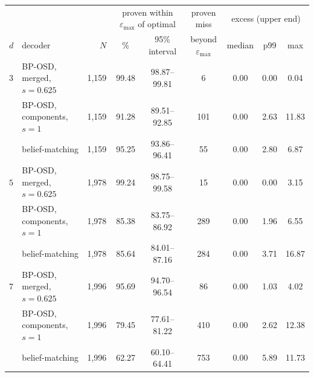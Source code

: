 \begin{tabular}{@{}llrcccccc@{}}
\toprule
 & & & \multicolumn{2}{c}{proven within $\varepsilon_{\max}$ of optimal} & proven miss & \multicolumn{3}{c}{excess (upper end)} \\
$d$ & decoder & $N$ & \% & 95\% interval & beyond $\varepsilon_{\max}$ & median & p99 & max \\
\midrule
$3$ & BP-OSD, merged, $s=0.625$ & 1{,}159 & 99.48 & 98.87--99.81 & 6 & 0.00 & 0.00 & 0.04 \\
 & BP-OSD, components, $s=1$ & 1{,}159 & 91.28 & 89.51--92.85 & 101 & 0.00 & 2.63 & 11.83 \\
 & belief-matching & 1{,}159 & 95.25 & 93.86--96.41 & 55 & 0.00 & 2.80 & 6.87 \\
\addlinespace
$5$ & BP-OSD, merged, $s=0.625$ & 1{,}978 & 99.24 & 98.75--99.58 & 15 & 0.00 & 0.00 & 3.15 \\
 & BP-OSD, components, $s=1$ & 1{,}978 & 85.38 & 83.75--86.92 & 289 & 0.00 & 1.96 & 6.55 \\
 & belief-matching & 1{,}978 & 85.64 & 84.01--87.16 & 284 & 0.00 & 3.71 & 16.87 \\
\addlinespace
$7$ & BP-OSD, merged, $s=0.625$ & 1{,}996 & 95.69 & 94.70--96.54 & 86 & 0.00 & 1.03 & 4.02 \\
 & BP-OSD, components, $s=1$ & 1{,}996 & 79.45 & 77.61--81.22 & 410 & 0.00 & 2.62 & 12.38 \\
 & belief-matching & 1{,}996 & 62.27 & 60.10--64.41 & 753 & 0.00 & 5.89 & 11.73 \\
\bottomrule
\end{tabular}
